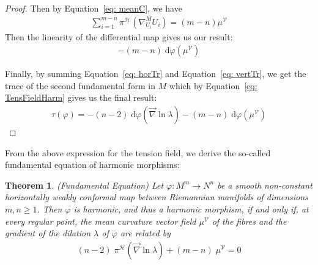 \documentclass[12pt]{article}
\newcommand{\diff}{\text{d}}
\newtheorem{theorem}{Theorem}[section]
\theoremstyle{definition}
\numberwithin{equation}{subsection}
\begin{document}
\begin{proof}
Then by Equation~\ref{eq: meanC}, we have
\begin{align*}
    \sum_{i=1}^{m - n} \pi^\mathcal{H} ( \nabla_{U_i} ^ M U_i ) = (m -n) \mu^\mathcal{V}
\end{align*}
Then the linearity of the differential map gives us our result:
\begin{align}\label{eq: vertTr}
    -(m-n) \; \diff \varphi( \mu^\mathcal{V})
\end{align}

Finally, by summing Equation~\ref{eq: horTr} and Equation~\ref{eq: vertTr}, we get the trace of the second fundamental form in $M$ which by Equation~\ref{eq: TensFieldHarm} gives us the final result:
\begin{align*}
    \tau(\varphi) = -(n -2)\; \diff \varphi (\vec{\nabla} \ln \lambda ) - (m - n)\; \diff \varphi (\mu^\mathcal{V})
\end{align*}
\end{proof}

From the above expression for the tension field, we derive the so-called fundamental equation of harmonic morphisms:
\begin{theorem}
(Fundamental Equation) Let $\varphi: M^m \rightarrow N^n$ be a smooth non-constant horizontally weakly conformal map between Riemannian manifolds of dimensions $m,n \geq 1$. Then $\varphi$ is harmonic, and thus a harmonic morphism, if and only if, at every regular point, the mean curvature vector field $\mu^\mathcal{V}$ of the fibres and the gradient of the dilation $\lambda$ of $\varphi$ are related by 
\begin{align} \label{eq: FundaEq}
      (n -2)\; \pi^\mathcal{H} (\vec{\nabla} \ln \lambda ) + (m - n)\;  \mu^\mathcal{V} = 0
\end{align}
\end{theorem}
\end{document}
